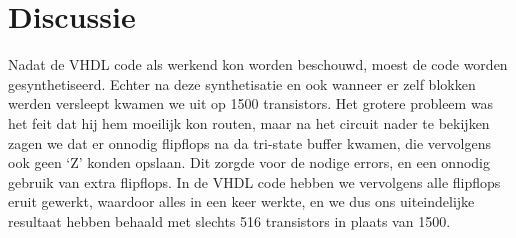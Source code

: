 \documentclass{scrreprt} %
\begin{document}
\section{Discussie}

Nadat de VHDL code als werkend kon worden beschouwd, moest de code worden gesynthetiseerd. Echter na deze synthetisatie en ook wanneer er zelf blokken werden versleept kwamen we uit op 1500 transistors. Het grotere probleem was het feit dat hij hem moeilijk kon routen, maar na het circuit nader te bekijken zagen we dat er onnodig flipflops na da tri-state buffer kwamen, die vervolgens ook geen ‘Z’ konden opslaan. Dit zorgde voor de nodige errors, en een onnodig gebruik van extra flipflops. In de VHDL code hebben we vervolgens alle flipflops eruit gewerkt, waardoor alles in een keer werkte, en we dus ons uiteindelijke resultaat hebben behaald met slechts 516 transistors in plaats van 1500.
\end{document}
